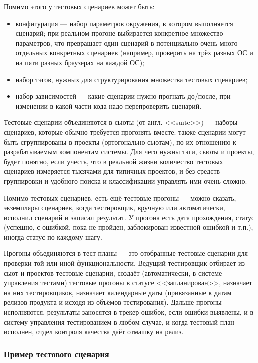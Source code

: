 \documentclass{../../text-style}
\begin{document}
Помимо этого у тестовых сценариев может быть:

\begin{itemize}
    \item конфигурация --- набор параметров окружения, в котором выполняется сценарий; при реальном прогоне выбирается конкретное множество параметров, что превращает один сценарий в потенциально очень много отдельных конкретных сценариев (например, проверить на трёх разных ОС и на пяти разных браузерах на каждой ОС);
    \item набор тэгов, нужных для структурирования множества тестовых сценариев;
    \item набор зависимостей --- какие сценарии нужно прогнать до/после, при изменении в какой части кода надо перепроверить сценарий.
\end{itemize}

Тестовые сценарии объединяются в сьюты (от англ. <<suite>>) --- наборы сценариев, которые обычно требуется прогонять вместе. также сценарии могут быть сгруппированы в проекты (ортогонально сьютам), по их отношению к разрабатываемым компонентам системы. Для чего нужны тэги, сьюты и проекты, будет понятно, если учесть, что в реальной жизни количество тестовых сценариев измеряется тысячами для типичных проектов, и без средств группировки и удобного поиска и классификации управлять ими очень сложно.

Помимо тестовых сценариев, есть ещё тестовые прогоны --- можно сказать, экземпляры сценариев, когда тестировщик, вручную или автоматически, исполнил сценарий и записал результат. У прогона есть дата прохождения, статус (успешно, с ошибкой, пока не пройден, заблокирован известной ошибкой и т.п.), иногда статус по каждому шагу. 

Прогоны объединяются в тест-планы --- это отобранные тестовые сценарии для проверки той или иной функциональности. Ведущий тестировщик отбирает из сьют и проектов тестовые сценарии, создаёт (автоматически, в системе управления тестами) тестовые прогоны в статусе <<запланирован>>, назначает на них тестировщиков, назначает календарные даты (привязанные к датам релизов продукта и исходя из объёмов тестирования). Дальше прогоны исполняются, результаты заносятся в трекер ошибок, если ошибки выявлены, и в систему управления тестированием в любом случае, и когда тестовый план исполнен, отдел контроля качества даёт отмашку на релиз.

\subsubsection{Пример тестового сценария}
\end{document}

